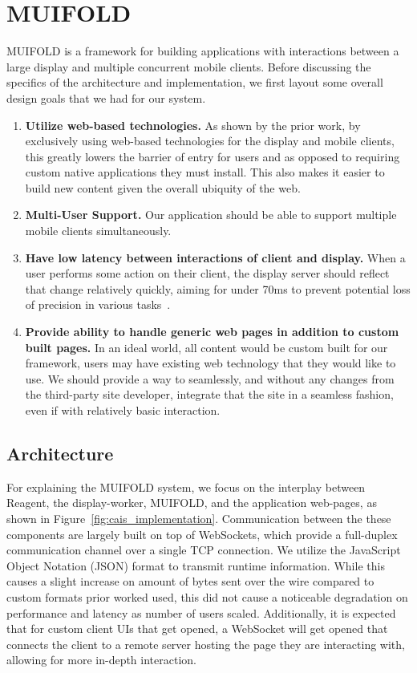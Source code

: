 \section{MUIFOLD}

MUIFOLD is a framework for building applications with interactions
between a large display and multiple concurrent mobile clients.
Before discussing the specifics of the architecture and
implementation, we first layout some overall design goals that
we had for our system.

\begin{enumerate}
    \item \textbf{Utilize web-based technologies.} As shown by
    the prior work, by exclusively using web-based technologies
    for the display and mobile clients, this greatly lowers the
    barrier of entry for users and as opposed to requiring custom
    native applications they must install. This also makes it easier
    to build new content given the overall ubiquity of the web.
    \item \textbf{Multi-User Support.} Our application should
    be able to support multiple mobile clients simultaneously.
    \item \textbf{Have low latency between interactions of client and display.} When a user performs some action on their client, the
    display server should reflect that change relatively quickly,
    aiming for under 70ms to prevent potential loss of precision
    in various tasks~\cite{ivkovic_quantifying_2015}.
    \item \textbf{Provide ability to handle generic web pages in
    addition to custom built pages.} In an ideal world, all
    content would be custom built for our framework, users may
    have existing web technology that they would like to use. We
    should provide a way to seamlessly, and without any changes from
    the third-party site developer, integrate that the site in a
    seamless fashion, even if with relatively basic interaction.
\end{enumerate}

\subsection{Architecture}

For explaining the MUIFOLD system, we focus on the interplay between
Reagent, the display-worker, MUIFOLD, and the application web-pages, as
shown in Figure~\ref{fig:cais_implementation}.
Communication between the these components are largely built on top of  WebSockets,
which provide a full-duplex
communication channel over a single TCP connection. We utilize the
JavaScript Object Notation (JSON) format to transmit runtime
information. While this causes a slight increase on amount of bytes
sent over the wire compared to custom formats prior worked used,
this did not cause a noticeable degradation on performance and
latency as number of users scaled. Additionally, it is expected
that for custom client UIs that get opened, a WebSocket will
get opened that connects the client to a remote server hosting
the page they are interacting with, allowing for more
in-depth interaction.

